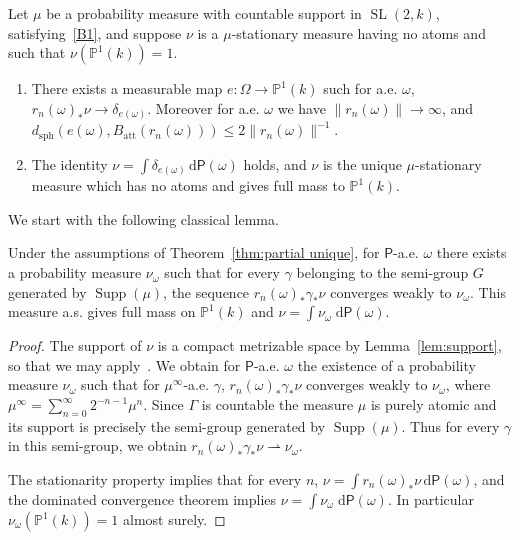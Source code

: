 \documentclass[AHL,Unicode,longabstracts]{cedram}
\DeclareMathOperator{\supp}{Supp}
\DeclareMathOperator{\SL}{SL}
\newcommand{\prob}{\mathsf{P}}
\newcommand{\cvf}{\rightharpoonup}
\newcommand{\PP}{\mathbb{P}}
\newcommand{\att}{\mathrm{att}}
\newcommand{\SLk}{\SL(2,k)}
\newcommand*{\dd}{\mathrm{d}}
\newcommand*{\dprob}{\dd \prob}
\begin{document}
\begin{theo}\label{thm:partial unique}
Let $\mu$ be a probability measure with countable support in $\SLk$, satisfying~\eqref{B1}, and suppose $\nu$ is a $\mu$-stationary measure having no atoms and such that $\nu(\PP^1(k)) = 1$.
\begin{enumerate}
\item There exists a measurable map $e: \Omega \to \PP^1(k)$ such for a.e. $\omega$, $r_n(\omega)_* \nu \to \delta_{e(\omega)}$. Moreover for a.e. $\omega$ we have $\|r_n(\omega)\| \to \infty$, and $d_{\mathrm{sph}}(e(\omega), B_\att(r_n(\omega))) \le 2 \|r_n(\omega)\|^{-1}$.
\item The identity $\nu = \int \delta_{e(\omega)} \, \dprob(\omega)$ holds, and $\nu$ is the unique $\mu$-stationary measure which has no atoms and gives full mass to $\PP^1(k)$.
\end{enumerate}
\end{theo}

We start with the following classical lemma.

\begin{lemm}\label{lem:guivarch raugi}
Under the assumptions of Theorem~\ref{thm:partial unique}, for $\prob$-a.e. $\omega$ there exists a probability measure $\nu_\omega$ such that for every $\gamma$ belonging to the semi-group $G$ generated by $\supp(\mu)$, the sequence $r_n(\omega)_*\gamma_*\nu$ converges weakly to $\nu_\omega$. This measure a.s. gives full mass on $\PP^1(k)$ and $\nu = \int \nu_\omega \; \dprob(\omega)$.
\end{lemm}

\begin{proof}
The support of $\nu$ is a compact metrizable space by Lemma~\ref{lem:support}, so that we may apply~\cite[Lem.~2.1, p.~19]{bougerol-lacroix}. We obtain for $\prob$-a.e. $\omega$ the existence of a probability measure $\nu_\omega$ such that for $\mu^\infty$-a.e. $\gamma$, $r_n(\omega)_*\gamma_*\nu$ converges weakly to $\nu_\omega$, where $\mu^\infty = \sum_{n = 0}^\infty 2^{-n-1}\mu^n$. Since $\Gamma$ is countable the measure $\mu$ is purely atomic and its support is precisely the semi-group generated by $\supp(\mu)$. Thus for every $\gamma$ in this semi-group, we obtain $r_n(\omega)_*\gamma_*\nu \cvf \nu_\omega$.

The stationarity property implies that for every $n$, $\nu = \int r_n(\omega)_* \nu\, \dprob(\omega)$, and the dominated convergence theorem implies $\nu = \int \nu_\omega \; \dprob(\omega)$. In particular $\nu_\omega(\PP^1(k)) =1$ almost surely.
\end{proof}
\end{document}
